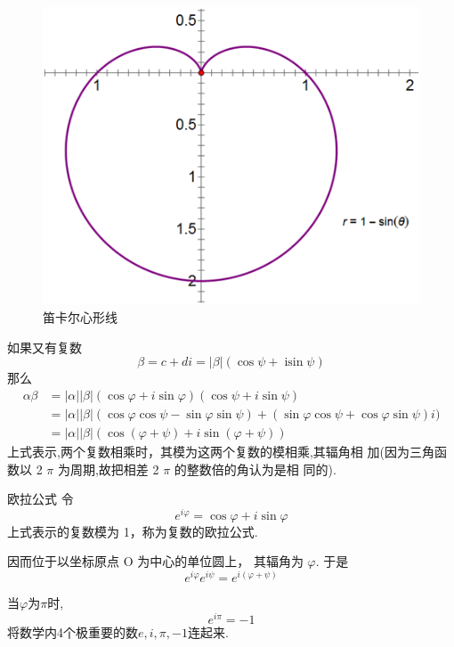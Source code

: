 \documentclass[13pt]{beamer}
\begin{document}
\begin{frame}
\begin{center}
\begin{figure}[t]
	\includegraphics[scale=0.4]{r=1-sintheta.png}
	\caption{笛卡尔心形线~~~~~~}
\end{figure}

\end{center}


\end{frame}


\begin{frame}
如果又有复数
\[
\beta=c+d {i}=|\beta|(\cos \psi+\operatorname{isin} \psi)
\]
那么
\[
\begin{aligned}
\alpha \beta &=|\alpha||\beta|(\cos \varphi+i \operatorname{sin} \varphi)(\cos \psi+ i \operatorname{sin} \psi) \\
&=|\alpha||\beta|(\cos \varphi \cos \psi-\sin \varphi \sin \psi)+(\sin \varphi \cos \psi+\cos \varphi \sin \psi) {i}) \\
&=|\alpha||\beta|(\cos (\varphi+\psi)+i \operatorname{sin}(\varphi+\psi))
\end{aligned}
\]
上式表示,两个复数相乘时，其模为这两个复数的模相乘,其辐角相 加(因为三角函数以 2 $\pi$ 为周期,故把相差 2 $\pi$ 的整数倍的角认为是相 同的).
\end{frame}

\begin{frame}{欧拉公式}
令
\[
{e}^{{i} \varphi}=\cos \varphi+{i} \sin \varphi
\]
上式表示的复数模为 1，称为复数的欧拉公式. 

因而位于以坐标原点 O 为中心的单位圆上， 其辐角为 $\varphi$. 于是
\[
{e}^{{i} \varphi} {e}^{{i} \psi}={e}^{{i}(\varphi+\psi)}
\]


当$\varphi$为$\pi$时, $$ e^{i\pi }=-1$$
将数学内4个极重要的数$e, i, \pi, -1 $连起来.
\end{frame}
\end{document}
